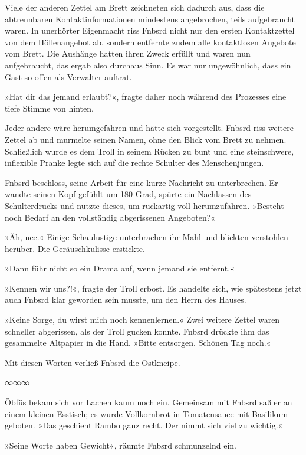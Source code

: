Viele der anderen Zettel am Brett zeichneten sich dadurch aus, dass die abtrennbaren Kontaktinformationen mindestens angebrochen, teils aufgebraucht waren. In unerhörter Eigenmacht riss Fnbsrd nicht nur den ersten Kontaktzettel von dem Höllenangebot ab, sondern entfernte zudem alle kontaktlosen Angebote vom Brett. Die Aushänge hatten ihren Zweck erfüllt und waren nun aufgebraucht, das ergab also durchaus Sinn. Es war nur ungewöhnlich, dass ein Gast so offen als Verwalter auftrat.

»Hat dir das jemand erlaubt?«, fragte daher noch während des Prozesses eine tiefe Stimme von hinten.

Jeder andere wäre herumgefahren und hätte sich vorgestellt. Fnbsrd riss weitere Zettel ab und murmelte seinen Namen, ohne den Blick vom Brett zu nehmen. Schließlich wurde es dem Troll in seinem Rücken zu bunt und eine steinschwere, inflexible Pranke legte sich auf die rechte Schulter des Menschenjungen.

Fnbsrd beschloss, seine Arbeit für eine kurze Nachricht zu unterbrechen. Er wandte seinen Kopf gefühlt um 180 Grad, spürte ein Nachlassen des Schulterdrucks und nutzte dieses, um ruckartig voll herumzufahren. »Besteht noch Bedarf an den vollständig abgerissenen Angeboten?«

»Äh, nee.« Einige Schaulustige unterbrachen ihr Mahl und blickten verstohlen herüber. Die Geräuschkulisse erstickte.

»Dann führ nicht so ein Drama auf, wenn jemand sie entfernt.«

»Kennen wir uns?!«, fragte der Troll erbost. Es handelte sich, wie spätestens jetzt auch Fnbsrd klar geworden sein musste, um den Herrn des Hauses.

»Keine Sorge, du wirst mich noch kennenlernen.« Zwei weitere Zettel waren schneller abgerissen, als der Troll gucken konnte. Fnbsrd drückte ihm das gesammelte Altpapier in die Hand. »Bitte entsorgen. Schönen Tag noch.«

Mit diesen Worten verließ Fnbsrd die Ostkneipe.

\begin{center}
∞∞∞
\end{center}

Öbfüs bekam sich vor Lachen kaum noch ein. Gemeinsam mit Fnbsrd saß er an einem kleinen Esstisch; es wurde Vollkornbrot in Tomatensauce mit Basilikum geboten. »Das geschieht Rambo ganz recht. Der nimmt sich viel zu wichtig.«

»Seine Worte haben Gewicht«, räumte Fnbsrd schmunzelnd ein.

